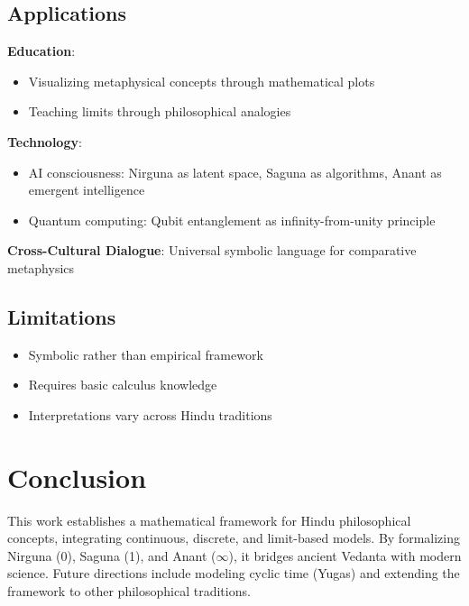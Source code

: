 \documentclass[11pt]{article}
\begin{document}
\subsection{Applications}
\textbf{Education}:
\begin{itemize}
    \item Visualizing metaphysical concepts through mathematical plots
    \item Teaching limits through philosophical analogies
\end{itemize}

\textbf{Technology}:
\begin{itemize}
    \item AI consciousness: Nirguna as latent space, Saguna as algorithms, Anant as emergent intelligence
    \item Quantum computing: Qubit entanglement as infinity-from-unity principle
\end{itemize}

\textbf{Cross-Cultural Dialogue}: Universal symbolic language for comparative metaphysics

\subsection{Limitations}
\begin{itemize}
    \item Symbolic rather than empirical framework
    \item Requires basic calculus knowledge
    \item Interpretations vary across Hindu traditions
\end{itemize}

\section{Conclusion}
This work establishes a mathematical framework for Hindu philosophical concepts, integrating continuous, discrete, and limit-based models. By formalizing Nirguna (0), Saguna (1), and Anant (\(\infty\)), it bridges ancient Vedanta with modern science. Future directions include modeling cyclic time (Yugas) and extending the framework to other philosophical traditions.
\end{document}
